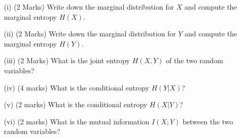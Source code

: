 \documentclass[]{article}
\begin{document}
\begin{itemize}
\begin{itemize}
\item[(i)] (2 Marks) Write down the marginal distribution for $X$ and compute the marginal entropy $H(X)$.
\item[(ii)] (2 Marks) Write down the marginal distribution for $Y$ and compute the marginal entropy $H(Y )$.
\item[(iii)] (2 Marks) What is the joint entropy $H(X, Y ) $ of the two random variables?
\item[(iv)] (4 marks) What is the conditional entropy $H(Y|X)$?
\item[(v)] (2 marks) What is the conditional entropy $H(X|Y)$?
\item[(vi)] (2 marks) What is the mutual information $I(X;Y)$ between the two random variables?
\end{itemize}
\end{itemize}
\end{document}

